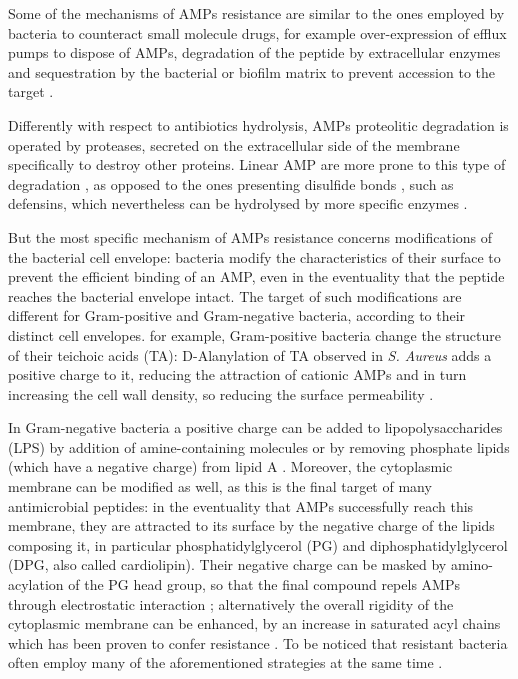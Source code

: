 Some of the mechanisms of AMPs resistance are similar to the ones employed by bacteria to counteract small molecule drugs, for example over-expression of efflux pumps to dispose of AMPs, degradation of the peptide by extracellular enzymes and sequestration by the bacterial or biofilm matrix to prevent accession to the target \citep{Peschel2006}.

Differently with respect to antibiotics hydrolysis, AMPs proteolitic degradation is operated by proteases, secreted on the extracellular side of the membrane specifically to destroy other proteins. Linear AMP are more prone to this type of degradation \citep{Sieprawska-Lupa2004}, as opposed to the ones presenting disulfide bonds \citep{Peschel2006}, such as defensins, which nevertheless can be hydrolysed by more specific enzymes \citep{Nelson2011}.

But the most specific mechanism of AMPs resistance concerns modifications of the bacterial cell envelope: bacteria modify the characteristics of their surface to prevent the efficient binding of an AMP, even in the eventuality that the peptide reaches the bacterial envelope intact. 
%
The target of such modifications are different for Gram-positive and Gram-negative bacteria, according to their distinct cell envelopes.
%
for example, Gram-positive bacteria change the structure of their teichoic acids (TA): D-Alanylation of TA observed in \emph{S. Aureus} adds a positive charge to it, reducing the attraction of cationic AMPs and in turn increasing the cell wall density, so reducing the surface permeability \citep{Saar-Dover2012}.

In Gram-negative bacteria a positive charge can be added to lipopolysaccharides (LPS) by addition of amine-containing molecules \citep{Moskowitz2004} or by removing phosphate lipids (which have a negative charge) from lipid A \citep{Wang2006lpx}.
%
Moreover, the cytoplasmic membrane can be modified as well, as this is the final target of many antimicrobial peptides: in the eventuality that AMPs successfully reach this membrane, they are attracted to its surface by the negative charge of the lipids composing it, in particular phosphatidylglycerol (PG) and diphosphatidylglycerol (DPG, also called cardiolipin). Their negative charge can be masked by amino-acylation of the PG head group, so that the final compound repels AMPs through electrostatic interaction \citep{Peschel2001}; alternatively the overall rigidity of the cytoplasmic membrane can be enhanced, by an increase in saturated acyl chains which has been proven to confer resistance \citep{Kumariya2015}.
%
To be noticed that resistant bacteria often employ many of the aforementioned strategies at the same time \citep{Band2014}.


